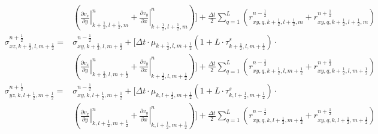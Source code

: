 \documentclass[pdftex,a4paper,parskip,listof=totoc,bibliography=totoc,onehalfspacing,12pt]{scrreprt}
\begin{document}
\begin{align*}
	&\left( \left.\frac{\partial v_x}{\partial y}\right\rvert_{k+\frac{1}{2},l+\frac{1}{2},m}^n + \left.\frac{\partial v_y}{\partial x}\right\rvert_{k+\frac{1}{2},l+\frac{1}{2},m}^n \right)\Bigg] + \frac{\Delta t}{2} \sum _{q=1}^{L} \left( r_{xy,q,k+\frac{1}{2},l+\frac{1}{2},m}^{n-\frac{1}{2}}+ r_{xy,q,k+\frac{1}{2},l+\frac{1}{2},m}^{n+\frac{1}{2}}\right) \\
	\sigma_{xz,k+\frac{1}{2},l,m+\frac{1}{2}}^{n+\frac{1}{2}} =&\sigma_{xy,k+\frac{1}{2},l,m+\frac{1}{2}}^{n-\frac{1}{2}}+\Bigg[\Delta t \cdot \mu_{k+\frac{1}{2},l,m+\frac{1}{2}}\left(1+L\cdot\tau_{k+\frac{1}{2},l,m+\frac{1}{2}}^s \right)\cdot \\ 
	&\left( \left.\frac{\partial v_x}{\partial y}\right\rvert_{k+\frac{1}{2},l,m+\frac{1}{2}}^n + \left.\frac{\partial v_y}{\partial x}\right\rvert_{k+\frac{1}{2},l,m+\frac{1}{2}}^n \right)\Bigg]  + \frac{\Delta t}{2} \sum _{q=1}^{L} \left( r_{xy,q,k+\frac{1}{2},l,m+\frac{1}{2}}^{n-\frac{1}{2}}+ r_{xy,q,k+\frac{1}{2},l,m+\frac{1}{2}}^{n+\frac{1}{2}}\right) \\
	\sigma_{yz,k,l+\frac{1}{2},m+\frac{1}{2}}^{n+\frac{1}{2}} =& \sigma_{xy,k,l+\frac{1}{2},m+\frac{1}{2}}^{n-\frac{1}{2}}+\Bigg[\Delta t \cdot \mu_{k,l+\frac{1}{2},m+\frac{1}{2}}\left(1+L\cdot\tau_{k,l+\frac{1}{2},m+\frac{1}{2}}^s \right)\cdot \\ 
	&\left( \left.\frac{\partial v_x}{\partial y}\right\rvert_{k,l+\frac{1}{2},m+\frac{1}{2}}^n + \left.\frac{\partial v_y}{\partial x}\right\rvert_{k,l+\frac{1}{2},m+\frac{1}{2}}^n \right)\Bigg]  + \frac{\Delta t}{2} \sum _{q=1}^{L} \left( r_{xy,q,k,l+\frac{1}{2},m+\frac{1}{2}}^{n-\frac{1}{2}}+ r_{xy,q,k,l+\frac{1}{2},m+\frac{1}{2}}^{n+\frac{1}{2}}\right) \\
\end{align*}
\end{document}
